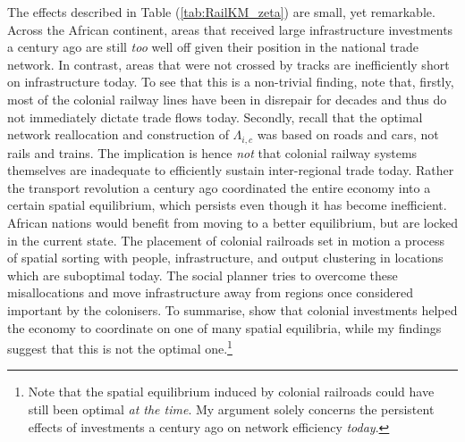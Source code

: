\documentclass[11pt, oneside]{article}   	%
\let\oldref\ref
\renewcommand{\ref}[1]{(\oldref{#1})}
\begin{document}
The effects described in Table \ref{tab:RailKM_zeta} are small, yet remarkable. Across the African continent, areas that received large infrastructure investments a century ago are still \emph{too} well off given their position in the national trade network. In contrast, areas that were not crossed by tracks are inefficiently short on infrastructure today. To see that this is a non-trivial finding, note that, firstly, most of the colonial railway lines have been in disrepair for decades and thus do not immediately dictate trade flows today. Secondly, recall that the optimal network reallocation and construction of $\Lambda_{i,c}$ was based on roads and cars, not rails and trains. The implication is hence \emph{not} that colonial railway systems themselves are inadequate to efficiently sustain inter-regional trade today. Rather the transport revolution a century ago coordinated the entire economy into a certain spatial equilibrium, which persists even though it has become inefficient. African nations would benefit from moving to a better equilibrium, but are locked in the current state. The placement of colonial railroads set in motion a process of spatial sorting with people, infrastructure, and output clustering in locations which are suboptimal today. The social planner tries to overcome these misallocations and move infrastructure away from regions once considered important by the colonisers. To summarise, \citeauthor{jedwab_permanent_2016} show that colonial investments helped the economy to coordinate on one of many spatial equilibria, while my findings suggest that this is not the optimal one.\footnote{Note that the spatial equilibrium induced by colonial railroads could have still been optimal \emph{at the time}. My argument solely concerns the persistent effects of investments a century ago on network efficiency \emph{today}.}
\end{document}
